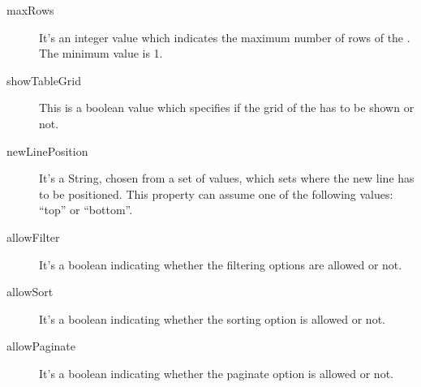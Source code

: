 				\begin{description}
					\item[maxRows] It's an integer value which indicates the maximum number of rows of the . The minimum value is 1.
					\item[showTableGrid] This is a boolean value which specifies if the grid of the  has to be shown or not.
					\item[newLinePosition] It's a String, chosen from a set of values, which sets where the new line has to be positioned. This property can assume one of the following values: “top” or “bottom”.
					\item[allowFilter] It's a boolean indicating whether the filtering options are allowed or not.
					\item[allowSort] It's a boolean indicating whether the sorting option is allowed or not.
					\item[allowPaginate] It's a boolean indicating whether the paginate option is allowed or not.
				\end{description}

